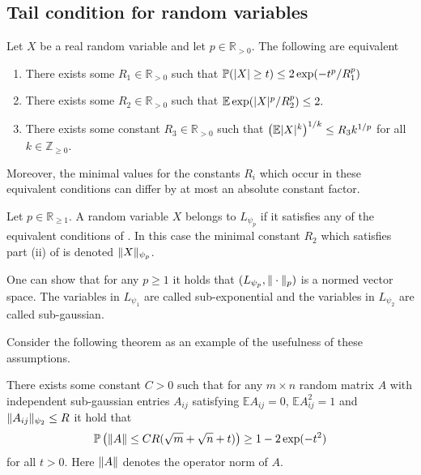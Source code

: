 \subsection{Tail condition for random variables}\label{sec: SubGSubE}
\begin{theorem}{\cite[Proof of Proposition 2.5.2]{vershynin2018high}}\label{thm: EquivalentLp}
  Let $X$ be a real random variable and let $p\in \mathbb{R}_{>0}$. The following are equivalent
  \begin{enumerate}[label = (\roman*)]
    \item There exists some $R_1\in \mathbb{R}_{>0}$ such that $\mathbb{P}(\vert X \vert\geq t) \leq 2\exp(-t^p/R_1^p)$
    \item There exists some $R_2\in \mathbb{R}_{>0}$ such that $\mathbb{E}\exp(\vert X \vert^p/R_2^p) \leq 2.$
    \item There exists some constant $R_3\in \mathbb{R}_{>0}$ such that $\left(\mathbb{E} \vert X \vert^k \right)^{1/k} \leq R_3k^{1/p}$
    for all $k\in \mathbb{Z}_{\geq 0}$.
  \end{enumerate}
  Moreover, the minimal values for the constants $R_i$ which occur in these equivalent conditions can differ by at most an absolute constant factor.
\end{theorem}
\begin{definition}
  Let $p\in \mathbb{R}_{\geq 1}$.
  A random variable $X$ belongs to $L_{\psi_p}$ if it satisfies any of the equivalent conditions of .
  In this case the minimal constant $R_2$ which satisfies part (ii) of  is denoted $\Vert X \Vert_{\psi_p}$.
\end{definition}
\begin{remark}
  One can show that for any $p\geq 1$ it holds that $(L_{\psi_p},\Vert \cdot \Vert_p)$ is a normed vector space.
  The variables in $L_{\psi_1}$ are called sub-exponential and the variables in $L_{\psi_2}$ are called sub-gaussian.
\end{remark}
Consider the following theorem as an example of the usefulness of these assumptions.
\begin{theorem}{\cite[Theorem 4.4.5]{vershynin2018high}}
  There exists some constant $C>0$ such that for any  $m\times n$ random matrix $A$ with independent sub-gaussian entries $A_{ij}$ satisfying $\mathbb{E}A_{ij} = 0$, $\mathbb{E}A_{ij}^2 = 1$ and $\Vert A_{ij} \Vert_{\psi_2}\leq R$
  it hold that
  $$\mathbb{P}\left(\Vert A \Vert \leq  CR(\sqrt{m} + \sqrt{n} + t)\right) \geq 1-2\exp(-t^2)$$
  for all $t>0$.
  Here $\Vert A \Vert$ denotes the operator norm of $A$.
\end{theorem}

